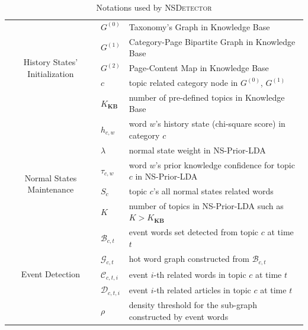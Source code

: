 \documentclass[conference,compsoc]{IEEEtran}
\begin{document}
\begin{table}
\scriptsize
\caption{Notations used by \textsc{NSDetector}}
\label{tbl:notations}
\begin{tabular}{|c|p{}|p{}|} \hline
\multirow{5}{0.13\columnwidth}{History States' Initialization} & \(G^{(0)}\) & Taxonomy's Graph in Knowledge Base\\ \cline{2-3}
& \(G^{(1)}\) & Category-Page Bipartite Graph in Knowledge Base\\ \cline{2-3}
& \(G^{(2)}\) & Page-Content Map in Knowledge Base\\ \cline{2-3}
& \(c\) & topic related category node in \(G^{(0)}\), \(G^{(1)}\) \\ \cline{2-3}
& \(K_{\bm{KB}}\) & number of pre-defined topics in Knowledge Base \\ \cline{2-3}
& \(h_{c,w}\) & word \(w\)'s history state (chi-square score) in category \(c\) \\ \hline
\multirow{4}{0.13\columnwidth}{Normal States Maintenance} & \(\lambda\) & normal state weight in  NS-Prior-LDA\\ \cline{2-3}
& \(\tau_{c,w}\) & word \(w\)'s prior knowledge confidence for topic \(c\) in NS-Prior-LDA\\ \cline{2-3}
& \(S_c\) & topic \(c\)'s all normal states related words \\ \cline{2-3}
& \(K\) & number of topics in NS-Prior-LDA such as \(K>K_{\bm{KB}}\)\\ \hline
\multirow{5}{0.13\columnwidth}{Event Detection} & \(\mathcal{B}_{c, t}\)  & event words set detected from topic \(c\) at time \(t\)  \\ \cline{2-3}
& \(\mathcal{G}_{c, t}\)  & hot word graph constructed from \(\mathcal{B}_{c, t}\) \\ \cline{2-3}
& \(\mathcal{C}_{c,t,i}\) & event \(i\)-th related words in topic \(c\) at time \(t\) \\ \cline{2-3}
& \(\mathcal{D}_{c,t,i}\) & event \(i\)-th related articles in topic \(c\) at time \(t\) \\ \cline{2-3}
& \(\rho\) & density threshold for the sub-graph constructed by event words  \\ \hline

\end{tabular}
\label{symbolsInModel}
\end{table}
\end{document}
